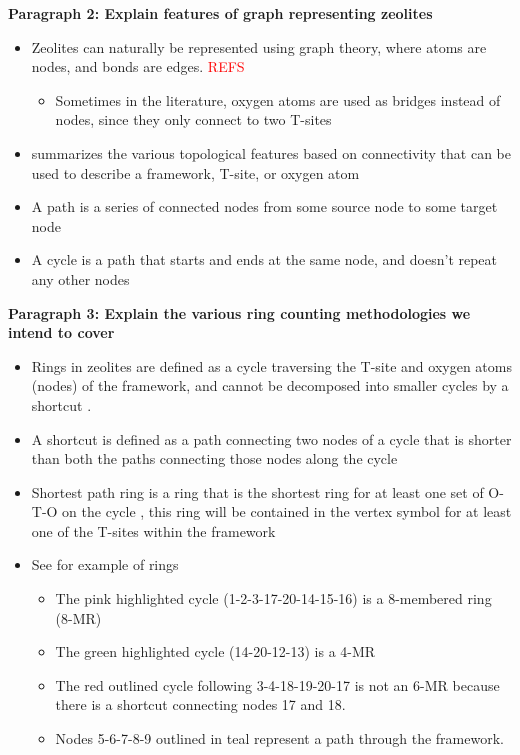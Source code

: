 \documentclass[11pt]{article}
\newcommand{\red}[1]{\textcolor{red}{#1}}
\begin{document}
\textbf{\textbf{Paragraph 2: Explain features of graph representing zeolites}}
\begin{itemize}
\item Zeolites can naturally be represented using graph theory, where atoms are nodes, and bonds are edges. \red{REFS}
\begin{itemize}
\item Sometimes in the literature, oxygen atoms are used as bridges instead of nodes, since they only connect to two T-sites
\end{itemize}
\item {} summarizes the various topological features based on connectivity that can be used to describe a framework, T-site, or oxygen atom
\item A path is a series of connected nodes from some source node to some target node
\item A cycle is a path that starts and ends at the same node, and doesn't repeat any other nodes
\end{itemize}

\textbf{\textbf{Paragraph 3: Explain the various ring counting methodologies we intend to cover}}
\begin{itemize}
\item Rings in zeolites are defined as a cycle traversing the T-site and oxygen atoms (nodes) of the framework, and cannot be decomposed into smaller cycles by a shortcut \cite{goetzke-properties-1991,guttman-ring-1990}.
\item A shortcut is defined as a path connecting two nodes of a cycle that is shorter than both the paths connecting those nodes along the cycle \cite{goetzke-properties-1991,guttman-ring-1990}
\item Shortest path ring is a ring that is the shortest ring for at least one set of O-T-O on the cycle \cite{sastre-topological-2009}, this ring will be contained in the vertex symbol for at least one of the T-sites within the framework
\item See  for example of rings
\begin{itemize}
\item The pink highlighted cycle (1-2-3-17-20-14-15-16) is a 8-membered ring (8-MR)
\item The green highlighted cycle (14-20-12-13) is a 4-MR
\item The red outlined cycle following 3-4-18-19-20-17 is not an 6-MR because there is a shortcut connecting nodes 17 and 18.
\item Nodes 5-6-7-8-9 outlined in teal represent a path through the framework.
\end{itemize}
\end{itemize}
\end{document}
